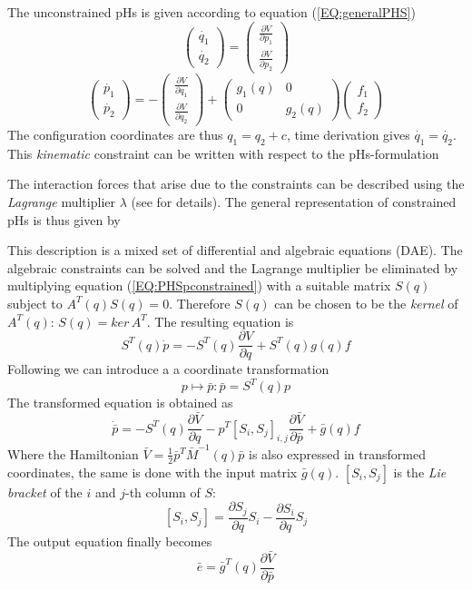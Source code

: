 \documentclass[a4paper,twoside, openright,12pt]{report}
\begin{document}
The unconstrained pHs is given according to equation (\ref{EQ:generalPHS})
\[\begin{pmatrix}\dot{q_1} \\ \dot{q_2}\end{pmatrix} = \begin{pmatrix}
\frac{\partial V}{\partial p_1} \\ \frac{\partial V}{\partial p_2}
\end{pmatrix} \]
\[\begin{pmatrix}\dot{p_1} \\ \dot{p_2}\end{pmatrix} = -\begin{pmatrix}
\frac{\partial V}{\partial q_1} \\ \frac{\partial V}{\partial q_2}
\end{pmatrix}  + \begin{pmatrix}g_1(q) & 0 \\ 0 & g_2(q)\end{pmatrix} \begin{pmatrix}f_1 \\ f_2\end{pmatrix}
\]
The configuration coordinates are thus $q_1 = q_2 + c$, time derivation gives $\dot{q_1}=\dot{q_2}$.
This \emph{kinematic} constraint can be written with respect to the pHs-formulation

The interaction forces that arise due to the constraints can be described using the \emph{Lagrange} multiplier $\lambda$ (see \cite{Schaft_13} for details). The general representation of constrained pHs is thus given by

This description is a mixed set of differential and algebraic equations (DAE). The algebraic constraints can be solved and the Lagrange multiplier be eliminated by multiplying equation (\ref{EQ:PHSpconstrained}) with a suitable matrix $S(q)$ subject to $A^T(q)S(q) = 0$. Therefore $S(q)$ can be chosen to be the \emph{kernel} of $A^T(q)$: $S(q) = ker \, A^T$.
The resulting equation is
\[S^T(q)\dot{p} = -S^T(q)\frac{\partial V}{\partial q} +S^T(q)g(q)f \]
Following \cite{Schaft_13} we can introduce a a coordinate transformation 
\begin{equation}\label{EQ:cooordtransmom}p \mapsto \bar{p}: \bar{p} = S^T(q)p \end{equation}
The transformed equation is obtained as
\[\dot{\bar{p}} = -S^T(q)\frac{\partial \bar{V}}{\partial q} -p^T [S_i,S_j]_{i,j} \frac{\partial \bar{V}}{\partial \bar{p}} + \bar{g}(q)f \]
Where the Hamiltonian $\bar{V} = \frac{1}{2}\bar{p}^T\bar{M}^{-1}(q)\bar{p}$ is also expressed in transformed coordinates, the same is done with the input matrix $\bar{g}(q)$. $ [S_i,S_j] $ is the \emph{Lie bracket} of the $i$ and $j$-th column of $S$:
\[[S_i,S_j] = \frac{\partial S_j}{\partial q}S_i - \frac{\partial S_i}{\partial q}S_j\] The output equation finally becomes 
\[ \bar{e} = \bar{g}^T(q) \frac{\partial \bar{V}}{\partial \bar{p}} \]
\end{document}

